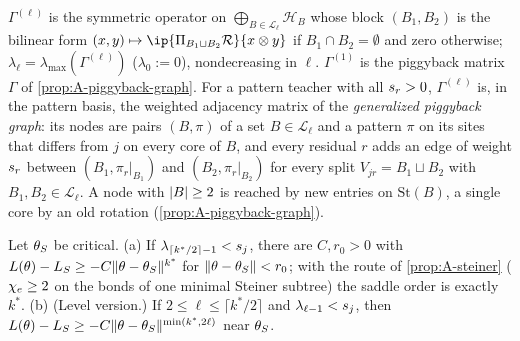 \begin{definition}\label{def:A-gen-piggyback}
  $\Gamma^{(\ell)}$ is the symmetric operator on $\bigoplus_{B\in\mathcal L_\ell}\mathcal H_B$ whose block
  $(B_1,B_2)$ is the bilinear form $(x,y)\mapsto\ip{\Pi_{B_1\sqcup B_2}\mathcal R}{x\otimes y}$ if
  $B_1\cap B_2=\emptyset$ and zero otherwise; $\lambda_\ell=\lambda_{\max}(\Gamma^{(\ell)})$ ($\lambda_0:=0$),
  nondecreasing in $\ell$. $\Gamma^{(1)}$ is the piggyback matrix $\Gamma$ of \cref{prop:A-piggyback-graph}. For a pattern
  teacher with all $s_{r}>0$, $\Gamma^{(\ell)}$ is, in the pattern basis, the weighted adjacency matrix of
  the \emph{generalized piggyback graph}: its nodes are pairs $(B,\pi)$ of a set $B\in\mathcal L_\ell$ and a
  pattern $\pi$ on its sites that differs from $j$ on every core of $B$, and every residual $r$ adds an edge
  of weight $s_{r}$ between $(B_1,\pi_r|_{B_1})$ and $(B_2,\pi_r|_{B_2})$ for every split
  $V_{jr}=B_1\sqcup B_2$ with $B_1,B_2\in\mathcal L_\ell$. A node with $\lvert B\rvert\ge2$ is reached by new
  entries on $\mathrm{St}(B)$, a single core by an old rotation (\cref{prop:A-piggyback-graph}).
\end{definition}

\begin{theorem}\label{thm:A-order-lower}
  \proven{} 
  Let $\theta_S$ be critical. (a) If $\lambda_{\lceil k^*/2\rceil-1}<s_{j}$, there are $C,r_0>0$ with
  $L(\theta)-L_S\ge-C\lVert\theta-\theta_S\rVert^{k^*}$ for $\lVert\theta-\theta_S\rVert<r_0$; with the route
  of \cref{prop:A-steiner} ($\chi_{e}\ge2$ on the bonds of one minimal Steiner subtree) the saddle order is
  exactly $k^*$. (b) (Level version.) If $2\le\ell\le\lceil k^*/2\rceil$ and $\lambda_{\ell-1}<s_{j}$, then
  $L(\theta)-L_S\ge-C\lVert\theta-\theta_S\rVert^{\min(k^*,2\ell)}$ near $\theta_S$.
\end{theorem}

